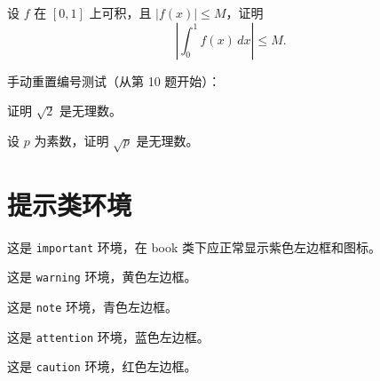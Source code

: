 \documentclass[12pt,a4paper]{ctexbook}
\begin{document}
\begin{homework}
设 $f$ 在 $[0,1]$ 上可积，且 $|f(x)|\leq M$，证明
\[
  \left|\int_0^1 f(x)\,dx\right| \leq M.
\]
\end{homework}

手动重置编号测试（从第 10 题开始）：

\begin{homework}[index=10]
证明 $\sqrt{2}$ 是无理数。
\end{homework}

\begin{homework}
设 $p$ 为素数，证明 $\sqrt{p}$ 是无理数。
\end{homework}

\section{提示类环境}

\begin{important}
这是 \texttt{important} 环境，在 book 类下应正常显示紫色左边框和图标。
\end{important}

\begin{warning}
这是 \texttt{warning} 环境，黄色左边框。
\end{warning}

\begin{note}
这是 \texttt{note} 环境，青色左边框。
\end{note}

\begin{attention}
这是 \texttt{attention} 环境，蓝色左边框。
\end{attention}

\begin{caution}
这是 \texttt{caution} 环境，红色左边框。
\end{caution}
\end{document}
